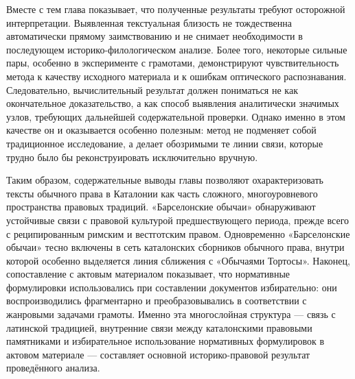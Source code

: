 Вместе с тем глава показывает, что полученные результаты требуют осторожной интерпретации. Выявленная текстуальная близость не тождественна автоматически прямому заимствованию и не снимает необходимости в последующем историко-филологическом анализе. Более того, некоторые сильные пары, особенно в эксперименте с грамотами, демонстрируют чувствительность метода к качеству исходного материала и к ошибкам оптического распознавания. Следовательно, вычислительный результат должен пониматься не как окончательное доказательство, а как способ выявления аналитически значимых узлов, требующих дальнейшей содержательной проверки. Однако именно в этом качестве он и оказывается особенно полезным: метод не подменяет собой традиционное исследование, а делает обозримыми те линии связи, которые трудно было бы реконструировать исключительно вручную.

Таким образом, содержательные выводы главы позволяют охарактеризовать тексты обычного права в Каталонии как часть сложного, многоуровневого пространства правовых традиций. «Барселонские обычаи» обнаруживают устойчивые связи с правовой культурой предшествующего периода, прежде всего с реципированным римским и вестготским правом. Одновременно «Барселонские обычаи» тесно включены в сеть каталонских сборников обычного права, внутри которой особенно выделяется линия сближения с «Обычаями Тортосы». Наконец, сопоставление с актовым материалом показывает, что нормативные формулировки использовались при составлении документов избирательно: они воспроизводились фрагментарно и преобразовывались в соответствии с жанровыми задачами грамоты. Именно эта многослойная структура --- связь с латинской традицией, внутренние связи между каталонскими правовыми памятниками и избирательное использование нормативных формулировок в актовом материале --- составляет основной историко-правовой результат проведённого анализа.
